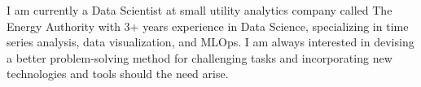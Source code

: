 

\begin{cvparagraph}

I am currently a Data Scientist at small utility analytics company called The Energy Authority with 3+ years experience in Data Science, specializing in time series analysis, data visualization, and MLOps. I am always interested in devising a better problem-solving method for challenging tasks and incorporating new technologies and tools should the need arise.
\end{cvparagraph}
